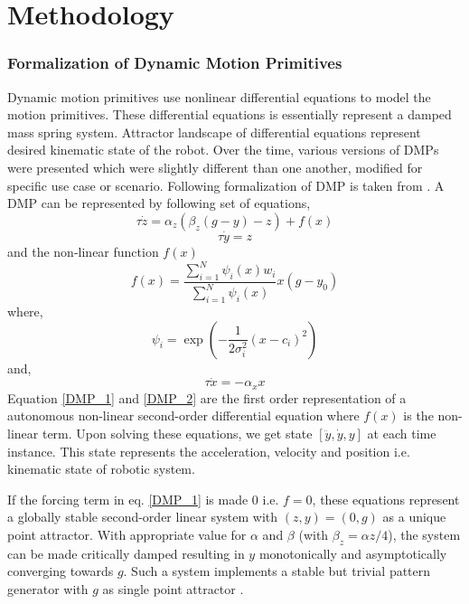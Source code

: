 \chapter{Methodology}


\subsection{Formalization of Dynamic Motion Primitives}

\par Dynamic motion primitives use nonlinear differential equations to model the motion primitives. These differential equations is essentially represent a damped mass spring system. Attractor landscape of differential equations represent desired kinematic state of the robot. Over the time, various versions of DMPs were presented which were slightly different than one another, modified for specific use case or scenario. Following formalization of DMP is taken from \cite{ijspeert2013dynamical}.
A DMP can be represented by following set of equations,  
\begin{equation}\label{DMP_1}
\tau\dot{z} = \alpha_{z}(\beta_{z}(g - y) - z) + f(x)
\end{equation}
\begin{equation}\label{DMP_2}
\tau \dot{y} = z
\end{equation}
and the non-linear function $f(x)$
\begin{equation}\label{forcing_term}
f(x) = \frac{\sum_{i=1}^{N}\psi_{i}(x)w_{i}}{\sum_{i=1}^{N}\psi_{i}(x)}x(g - y_{0})
\end{equation}
where,
\begin{equation}\label{psi}
\psi_{i} = \exp(-{\frac{1}{2\sigma_{i}^{2}}(x - c_{i})^{2}})
\end{equation}
and,
\begin{equation}\label{canonical}
\tau \dot{x} = -\alpha_{x}x
\end{equation}
Equation \ref{DMP_1} and \ref{DMP_2} are the first order representation of a autonomous non-linear second-order differential equation where $f(x)$ is the non-linear term. 
Upon solving these equations, we get state $[\ddot{y}, \dot{y}, y]$ at each time instance. This state represents the acceleration, velocity and position i.e. kinematic state of robotic system. 

If the forcing term in eq. \ref{DMP_1} is made 0 i.e. $f = 0$, these equations represent a globally stable second-order linear system with $(z, y) = (0, g)$ as a unique point attractor. With appropriate value for $\alpha$ and $\beta$ (with $\beta_{z} = \alpha{z}/4$), the system can be made critically damped resulting in $y$ monotonically and asymptotically converging towards $g$. Such a system implements a stable but trivial pattern generator with $g$ as single point attractor \cite{ijspeert2013dynamical}.

